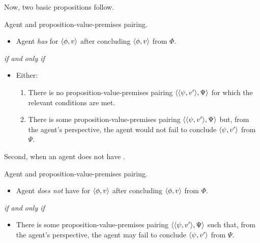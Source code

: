\begin{note}
  Now, two basic propositions follow.

  \begin{proposition}
    Agent and proposition-value-premises pairing.

    \begin{itemize}
    \item
      Agent \emph{has} \zS{} for \(\langle \phi, v \rangle\) after concluding \(\langle \phi, v \rangle\) from \(\Phi\).
    \end{itemize}

    \emph{if and only if}

    \begin{itemize}
    \item
      Either:
      \begin{enumerate}[label=(\alph*), ref=\alph*]
      \item
        There is no proposition-value-premises pairing \(\langle \langle \psi, v' \rangle, \Psi \rangle\) for which the relevant conditions are met.
      \item
        There is some proposition-value-premises pairing \(\langle \langle \psi, v' \rangle, \Psi \rangle\) but, from the agent's perspective, the agent would not fail to conclude \(\langle \psi, v' \rangle\) from \(\Psi\).
      \end{enumerate}
    \end{itemize}
  \end{proposition}

  Second, when an agent does not have \zS{}.

  \begin{proposition}
    Agent and proposition-value-premises pairing.
    \begin{itemize}
    \item
      Agent \emph{does not} have \zS{} for \(\langle \phi, v \rangle\) after concluding \(\langle \phi, v \rangle\) from \(\Phi\).
    \end{itemize}

    \emph{if and only if}

    \begin{itemize}
    \item
      There is some proposition-value-premises pairing \(\langle \langle \psi, v' \rangle, \Psi \rangle\) such that, from the agent's perspective, the agent may fail to conclude \(\langle \psi, v' \rangle\) from \(\Psi\).
    \end{itemize}
  \end{proposition}
\end{note}

